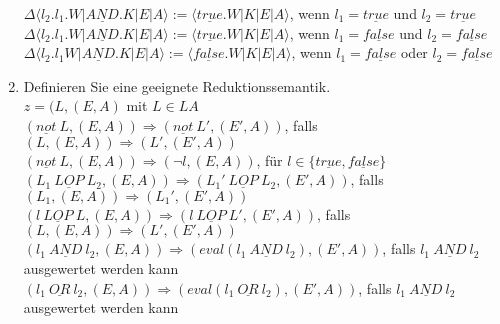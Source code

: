 \documentclass[ngerman,a4paper]{report}
\begin{document}
\begin{enumerate}
$\Delta\langle l_2.l_1.W|\underline{AND}.K|E|A\rangle:= \langle \underline{true}.W|K|E|A\rangle$, wenn $l_1=\underline{true}$ und $l_2=\underline{true}$\\
$\Delta\langle l_2.l_1.W|\underline{AND}.K|E|A\rangle:= \langle \underline{true}.W|K|E|A\rangle$, wenn $l_1=\underline{false}$ und $l_2=\underline{false}$\\
$\Delta\langle l_2.l_1W|\underline{AND}.K|E|A\rangle:= \langle \underline{false}.W|K|E|A\rangle$, wenn $l_1=\underline{false}$ oder $l_2=\underline{false}$\\
\item Definieren Sie eine geeignete Reduktionssemantik.\\
$z=(L, (E,A)$ mit $L \in LA$\\
$(\underline{not}\  L,(E,A)) \Rightarrow (\underline{not}\  L',(E',A))$, falls $(L,(E,A)) \Rightarrow (L',(E',A))$\\
$(\underline{not}\  L,(E,A)) \Rightarrow (\neg l,(E,A))$, für $l\in\{\underline{true},\underline{false}\}$\\

$(L_1\ \underline{LOP}\ L_2,(E,A)) \Rightarrow (L_1'\ \underline{LOP}\ L_2,(E',A))$, falls $(L_1,(E,A)) \Rightarrow (L_1',(E',A))$\\

$(l\ \underline{LOP}\ L,(E,A)) \Rightarrow (l\ \underline{LOP}\ L',(E',A))$, falls $(L,(E,A)) \Rightarrow (L',(E',A))$\\

$(l_1\ \underline{AND}\ l_2,(E,A)) \Rightarrow (eval(l_1\ \underline{AND}\ l_2),(E',A))$, falls $l_1\ \underline{AND}\ l_2$ ausgewertet werden kann
$(l_1\ \underline{OR}\ l_2,(E,A)) \Rightarrow (eval(l_1\ \underline{OR}\ l_2),(E',A))$, falls $l_1\ \underline{AND}\ l_2$ ausgewertet werden kann


\end{enumerate}
\end{document}
